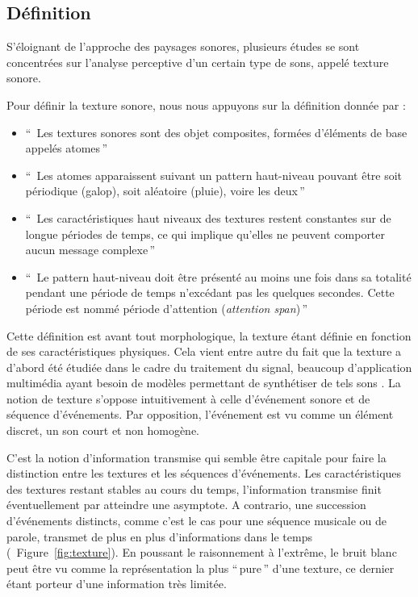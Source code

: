 \subsection{Définition}

S'éloignant de l'approche des paysages sonores, plusieurs études se sont concentrées sur l'analyse perceptive d'un certain type de sons, appelé texture sonore.

Pour définir la texture sonore, nous nous appuyons sur la définition donnée par \citep[p. 25]{saint1995classification}:  

\begin{itemize}
\item ``\, Les textures sonores sont des objet composites, formées d'éléments de base appelés atomes\,''
\item ``\, Les atomes apparaissent suivant un pattern haut-niveau pouvant être soit périodique (galop), soit aléatoire (pluie), voire les deux\,''
\item ``\, Les caractéristiques haut niveaux des textures restent constantes sur de longue périodes de temps, ce qui implique qu'elles ne peuvent comporter aucun message complexe\,''
\item ``\, Le pattern haut-niveau doit être présenté au moins une fois dans sa totalité pendant une période de temps n’excédant pas les quelques  secondes. Cette période est nommé période d'attention (\emph{attention span})\,''
\end{itemize}

Cette définition est avant tout morphologique, la texture étant définie en fonction de ses caractéristiques physiques. Cela vient entre autre du fait que la texture a d'abord été étudiée dans le cadre du traitement du signal, beaucoup d'application multimédia ayant besoin de  modèles permettant de synthétiser de tels sons \citep{schwarz2011state}. La notion de texture s'oppose intuitivement à celle d'événement sonore et de séquence d'événements. Par opposition, l'événement est vu comme un élément discret, un son court et non homogène.

C'est la notion d'information transmise qui semble être capitale pour faire la distinction entre les textures et les séquences d'événements.  Les caractéristiques des textures restant stables au cours du temps, l'information transmise finit éventuellement par atteindre une asymptote. A contrario, une succession d'événements distincts, comme c'est le cas pour une séquence musicale ou de parole, transmet de plus en plus d'informations dans le temps (\Cf~Figure~\ref{fig:texture}). En poussant le raisonnement à l’extrême, le bruit blanc peut être vu comme la représentation la plus ``\,pure\,'' d'une texture, ce dernier étant porteur d'une information très limitée.

